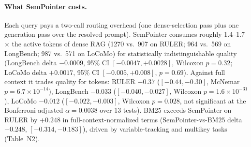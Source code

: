 \paragraph{What SemPointer costs.}
Each query pays a two-call routing overhead (one dense-selection pass plus one generation pass over the resolved prompt).
SemPointer consumes roughly 1.4--1.7$\times$ the active tokens of dense RAG (1270 vs.\ 907 on RULER; 964 vs.\ 569 on LongBench; 987 vs.\ 571 on LoCoMo) for statistically indistinguishable quality (LongBench delta $-0.0009$, 95\% CI $[-0.0047,+0.0028]$, Wilcoxon $p=0.32$; LoCoMo delta $+0.0017$, 95\% CI $[-0.005,+0.008]$, $p=0.69$).
Against full context it trades quality for tokens: RULER $-0.37$ ($[-0.44,-0.30]$, McNemar $p=6.7\times10^{-14}$), LongBench $-0.033$ ($[-0.040,-0.027]$, Wilcoxon $p=1.6\times10^{-31}$), LoCoMo $-0.012$ ($[-0.022,-0.003]$, Wilcoxon $p=0.028$, not significant at the Bonferroni-adjusted $\alpha=0.0038$ over 13 tests).
BM25 exceeds SemPointer on RULER by $+0.248$ in full-context-normalized terms (SemPointer-vs-BM25 delta $-0.248$, $[-0.314,-0.183]$), driven by variable-tracking and multikey tasks (Table~N2).
